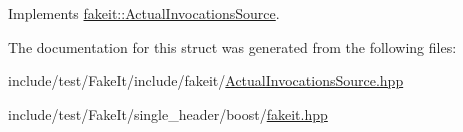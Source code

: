 Implements \mbox{\hyperlink{structfakeit_1_1ActualInvocationsSource_a274de522e11e1f9b8d70c6e0be9e5a9b}{fakeit\+::\+Actual\+Invocations\+Source}}.



The documentation for this struct was generated from the following files\+:\begin{DoxyCompactItemize}
\item 
include/test/\+Fake\+It/include/fakeit/\mbox{\hyperlink{ActualInvocationsSource_8hpp}{Actual\+Invocations\+Source.\+hpp}}\item 
include/test/\+Fake\+It/single\+\_\+header/boost/\mbox{\hyperlink{single__header_2boost_2fakeit_8hpp}{fakeit.\+hpp}}\end{DoxyCompactItemize}
